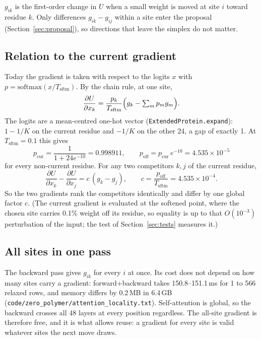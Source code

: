 \documentclass[11pt,a4paper]{article}
\newcommand{\Tsftm}{T_{\mathrm{sftm}}}
\newcommand{\file}[1]{\texttt{#1}}
\begin{document}
$g_{ik}$ is the first-order change in $U$ when a small weight is moved at site
$i$ toward residue $k$. Only differences $g_{ik}-g_{ij}$ within a site enter the
proposal (Section~\ref{sec:proposal}), so directions that leave the simplex do
not matter.

\subsection{Relation to the current gradient}
Today the gradient is taken with respect to the logits $x$ with
$p=\mathrm{softmax}(x/\Tsftm)$. By the chain rule, at one site,
\begin{equation}
  \frac{\partial U}{\partial x_k}
  = \frac{p_k}{\Tsftm}\Bigl(g_k - \textstyle\sum_m p_m g_m\Bigr).
\end{equation}
The logits are a mean-centred one-hot vector (\file{ExtendedProtein.expand}):
$1-1/K$ on the current residue and $-1/K$ on the other 24, a gap of exactly 1.
At $\Tsftm=0.1$ this gives
\begin{equation}
  p_{\mathrm{cur}} = \frac{1}{1+24e^{-10}} = 0.998911,\qquad
  p_{\mathrm{off}} = p_{\mathrm{cur}}\,e^{-10} = 4.535\times10^{-5}
\end{equation}
for every non-current residue. For any two competitors $k,j$ of the current
residue,
\begin{equation}\label{eq:scale}
  \frac{\partial U}{\partial x_k}-\frac{\partial U}{\partial x_j}
  = c\,(g_k-g_j),\qquad c=\frac{p_{\mathrm{off}}}{\Tsftm}=4.535\times10^{-4}.
\end{equation}
So the two gradients rank the competitors identically and differ by one
global factor $c$. (The current gradient is evaluated at the softened point,
where the chosen site carries 0.1\% weight off its residue, so equality is up to
that $O(10^{-3})$ perturbation of the input; the test of
Section~\ref{sec:tests} measures it.)

\subsection{All sites in one pass}
The backward pass gives $g_{ik}$ for every $i$ at once. Its cost does not depend
on how many sites carry a gradient: forward+backward takes 150.8--151.1\,ms for
1 to 566 relaxed rows, and memory differs by 0.2\,MB in 6.4\,GB
(\file{code/zero\_polymer/attention\_locality.txt}). Self-attention is global, so
the backward crosses all 48 layers at every position regardless. The all-site
gradient is therefore free, and it is what allows reuse: a gradient for every
site is valid whatever sites the next move draws.
\end{document}
